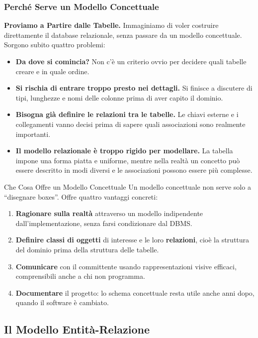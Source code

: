 \documentclass[12pt]{extarticle}
\begin{document}
\subsubsection{Perché Serve un Modello Concettuale}

\noindent \textbf{Proviamo a Partire dalle Tabelle.} Immaginiamo di voler costruire direttamente il database relazionale, senza passare da un modello concettuale. Sorgono subito quattro problemi:
\begin{itemize}
    \item \textbf{Da dove si comincia?} Non c'è un criterio ovvio per decidere quali tabelle creare e in quale ordine.
    \item \textbf{Si rischia di entrare troppo presto nei dettagli.} Si finisce a discutere di tipi, lunghezze e nomi delle colonne prima di aver capito il dominio.
    \item \textbf{Bisogna già definire le relazioni tra le tabelle.} Le chiavi esterne e i collegamenti vanno decisi prima di sapere quali associazioni sono realmente importanti.
    \item \textbf{Il modello relazionale è troppo rigido per modellare.} La tabella impone una forma piatta e uniforme, mentre nella realtà un concetto può essere descritto in modi diversi e le associazioni possono essere più complesse.
\end{itemize}

\begin{cbox}{Che Cosa Offre un Modello Concettuale}
\noindent Un modello concettuale non serve solo a ``disegnare boxes''. Offre quattro vantaggi concreti:
\begin{enumerate}
    \item \textbf{Ragionare sulla realtà} attraverso un modello indipendente dall'implementazione, senza farsi condizionare dal DBMS.
    \item \textbf{Definire classi di oggetti} di interesse e le loro \textbf{relazioni}, cioè la struttura del dominio prima della struttura delle tabelle.
    \item \textbf{Comunicare} con il committente usando rappresentazioni visive efficaci, comprensibili anche a chi non programma.
    \item \textbf{Documentare} il progetto: lo schema concettuale resta utile anche anni dopo, quando il software è cambiato.
\end{enumerate}
\end{cbox}

\subsection{Il Modello Entità-Relazione}
\end{document}
